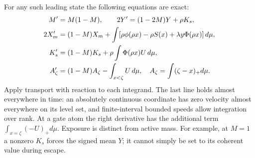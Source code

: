 \documentclass[11pt]{article}
\begin{document}
For any such leading state the following equations are exact:
\begin{align}
 M'&=M(1-M),\qquad
 2Y'=(1-2M)Y+\rho K_s,\notag\\
 2X_m'&=(1-M)X_m+\int [\rho\phi(\rho x)-\rho S(x)+
                      \lambda y\Phi(\rho x)]\,d\mu,\notag\\
 K_s'&=(1-M)K_s+\rho\int\Phi(\rho x)U\,d\mu,\notag\\
 A_\zeta'&=(1-M)A_\zeta-\int_{x<\zeta}U\,d\mu,\quad
 A_\zeta=\int(\zeta-x)_+d\mu .
 \label{an04rpsv1:moments}
\end{align}
Apply transport with reaction to each integrand. The last line holds
almost everywhere in time: an absolutely continuous coordinate has
zero velocity almost everywhere on its level set, and finite-interval
bounded speeds allow integration over rank. At a gate atom the right
derivative has the additional term \(\int_{x=\zeta}(-U)_+d\mu\).
Exposure is distinct from active mass. For example, at \(M=1\) a
nonzero \(K_s\) forces the signed mean \(Y\); it cannot simply be set
to its coherent value during escape.
\end{document}
